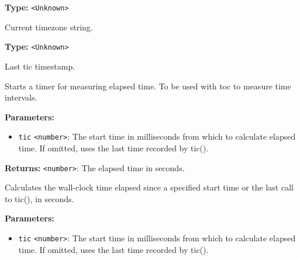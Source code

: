 \documentclass[12pt,a4paper]{article}
\begin{document}
\noindent \textbf{Type:} \texttt{<Unknown>}

\noindent Current timezone string.

\vspace{5mm}
\noindent {}\vspace{4mm}


\noindent \textbf{Type:} \texttt{<Unknown>}

\noindent Last tic timestamp.

\vspace{5mm}
\noindent {}


\noindent Starts a timer for measuring elapsed time. To be used with \textasciigrave{}toc\textasciigrave{} to measure time intervals.

\vspace{5mm}
\noindent {}


\noindent \textbf{Parameters:}
\begin{itemize}
  \item \texttt{tic} \texttt{<number>}: The start time in milliseconds from which to calculate elapsed time. If omitted, uses the last time recorded by \textasciigrave{}tic()\textasciigrave{}.
\end{itemize}

\noindent \textbf{Returns:} \texttt{<number>}: The elapsed time in seconds.

\noindent Calculates the wall-clock time elapsed since a specified start time or the last call to \textasciigrave{}tic()\textasciigrave{}, in seconds.

\vspace{5mm}
\noindent {}


\noindent \textbf{Parameters:}
\begin{itemize}
  \item \texttt{tic} \texttt{<number>}: The start time in milliseconds from which to calculate elapsed time. If omitted, uses the last time recorded by \textasciigrave{}tic()\textasciigrave{}.
\end{itemize}
\end{document}
